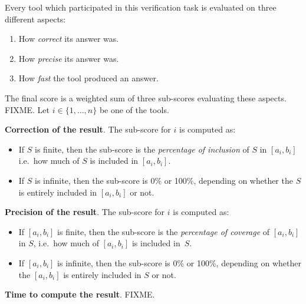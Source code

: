 \documentclass[10pt,english,a4paper]{article}
\newcommand\set[1]           {{\{ #1 \mathclose \}}}
\begin{document}
Every tool which participated in this verification task is evaluated on three
different aspects:
\begin{enumerate}
\item
  How \emph{correct} its answer was.
\item
  How \emph{precise} its answer was.
\item
  How \emph{fast} the tool produced an answer.
\end{enumerate}
The final score is a weighted sum of three sub-scores evaluating these aspects.
FIXME.
Let $i \in \set{1, \ldots, n}$ be one of the tools. 

\textbf{Correction of the result}. The sub-score for $i$ is computed as:
\begin{itemize}
\item
  If $S$ is finite, then the sub-score is the
  \textit{percentage of inclusion} of $S$ in $[a_i, b_i]$
  i.e.\ how much of $S$ is included in $[a_i,b_i]$.
\item
  If $S$ is infinite, then the sub-score is 0\% or 100\%, depending on whether
  the $S$ is entirely included in $[a_i,b_i]$ or not.
\end{itemize}

\textbf{Precision of the result}. The sub-score for $i$ is computed as:
\begin{itemize}
\item
  If $[a_i,b_i]$ is finite, then the sub-score is the
  \textit{percentage of coverage} of $[a_i, b_i]$ in $S$,
  i.e.\ how much of $[a_i,b_i]$ is included in~$S$.
\item
  If $[a_i,b_i]$ is infinite, then the sub-score is 0\% or 100\%, depending on
  whether the $[a_i,b_i]$ is entirely included in $S$ or not.
\end{itemize}

\textbf{Time to compute the result}. FIXME.
\end{document}

